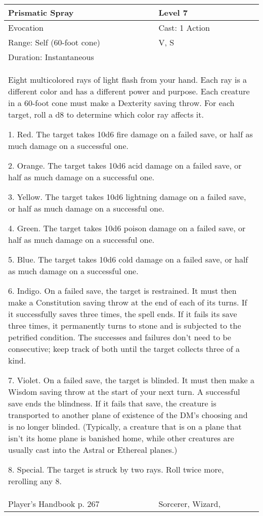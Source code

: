 \documentclass[11pt]{report}
\begin{document}
\begin{table}[H]
	\begin{tabular}{||p{6cm}|p{6cm}||}
		\hline\hline
		\bf{Prismatic Spray} & Level 7\\ \hline
		Evocation & Cast: 1 Action\\ \hline
		Range: Self (60-foot cone) & V, S\\ \hline
		Duration: Instantaneous & \\ \hline
		\multicolumn{2}{||p{12cm}||}{Eight multicolored rays of light flash from your hand. Each ray is a different color and has a different power and purpose. Each creature in a 60-foot cone must make a Dexterity saving throw. For each target, roll a d8 to determine which color ray affects it.

1. Red. The target takes 10d6 fire damage on a failed save, or half as much damage on a successful one.

2. Orange. The target takes 10d6 acid damage on a failed save, or half as much damage on a successful one.

3. Yellow. The target takes 10d6 lightning damage on a failed save, or half as much damage on a successful one.

4. Green. The target takes 10d6 poison damage on a failed save, or half as much damage on a successful one.

5. Blue. The target takes 10d6 cold damage on a failed save, or half as much damage on a successful one.

6. Indigo. On a failed save, the target is restrained. It must then make a Constitution saving throw at the end of each of its turns. If it successfully saves three times, the spell ends. If it fails its save three times, it permanently turns to stone and is subjected to the petrified condition. The successes and failures don’t need to be consecutive; keep track of both until the target collects three of a kind.

7. Violet. On a failed save, the target is blinded. It must then make a Wisdom saving throw at the start of your next turn. A successful save ends the blindness. If it fails that save, the creature is transported to another plane of existence of the DM’s choosing and is no longer blinded. (Typically, a creature that is on a plane that isn’t its home plane is banished home, while other creatures are usually cast into the Astral or Ethereal planes.)

8. Special. The target is struck by two rays. Roll twice more, rerolling any 8.}\\ \hline
Player's Handbook p. 267 & Sorcerer, Wizard, \\ \hline\hline
	\end{tabular}
\end{table}
\end{document}
